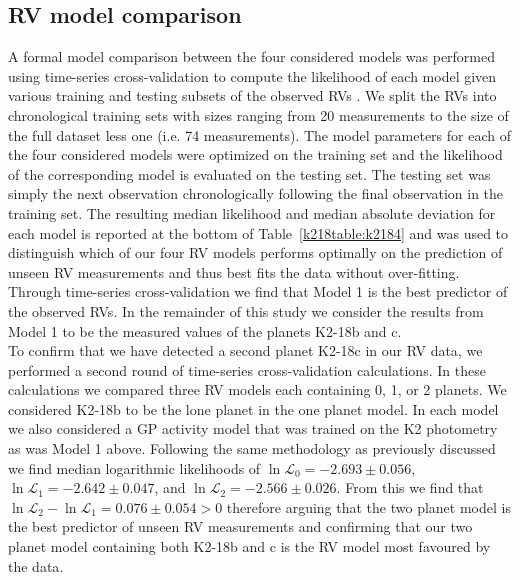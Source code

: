 \subsection{RV model comparison} \label{k218sect:modelcomp}
A formal model comparison between the four considered models was performed using
time-series cross-validation
to compute the likelihood of each model given various training and testing subsets of the 
observed RVs \citep{arlot10}.
We split the RVs into chronological training sets with sizes ranging from 20 measurements to the
size of the full dataset less one (i.e. 74 measurements). The model parameters for each of the
four considered models were optimized on the training
set and the likelihood of the corresponding model is evaluated on the testing set. The testing set was simply
the next observation chronologically following the final observation in the training set. The resulting median likelihood
and median absolute deviation for each model is
reported at the bottom of Table~\ref{k218table:k2184} and was used to distinguish which of our four
RV models performs optimally on the prediction of unseen RV measurements and thus best fits the data without over-fitting.
Through time-series cross-validation we find that Model 1 is the best predictor of the observed RVs. In the remainder of
this study we consider the results from Model 1 to be the measured values of the planets K2-18b and c. \\

To confirm that we have detected a second planet K2-18c in our RV data, we performed a second round of time-series
cross-validation calculations. In these calculations we compared
three RV models each containing 0, 1, or 2 planets. We considered K2-18b to be the
lone planet in the one planet model. In each model we also considered
a GP activity model that was trained on the K2 photometry as was Model 1 above.
Following the same methodology as previously
discussed we find median logarithmic likelihoods of $\ln{\mathcal{L}_0}=-2.693 \pm 0.056$,
$\ln{\mathcal{L}_1}=-2.642 \pm 0.047$, and $\ln{\mathcal{L}_2}=-2.566 \pm 0.026$.
From this we find that $\ln{\mathcal{L}_2}-\ln{\mathcal{L}_1} = 0.076 \pm 0.054 > 0$ therefore arguing that
the two planet model is the best predictor of unseen RV measurements and confirming that our two planet model
containing both K2-18b and c is the RV model most favoured by the data.  \\

